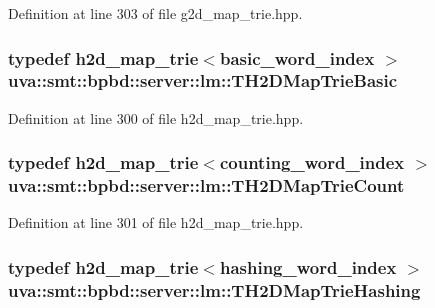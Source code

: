 Definition at line 303 of file g2d\+\_\+map\+\_\+trie.\+hpp.

\hypertarget{namespaceuva_1_1smt_1_1bpbd_1_1server_1_1lm_aa53359be0261f651cda52366e67b368f}{}
\subsubsection[{T\+H2\+D\+Map\+Trie\+Basic}]{\setlength{\rightskip}{0pt plus 5cm}typedef {\bf h2d\+\_\+map\+\_\+trie}$<${\bf basic\+\_\+word\+\_\+index} $>$ {\bf uva\+::smt\+::bpbd\+::server\+::lm\+::\+T\+H2\+D\+Map\+Trie\+Basic}}\label{namespaceuva_1_1smt_1_1bpbd_1_1server_1_1lm_aa53359be0261f651cda52366e67b368f}


Definition at line 300 of file h2d\+\_\+map\+\_\+trie.\+hpp.

\hypertarget{namespaceuva_1_1smt_1_1bpbd_1_1server_1_1lm_a16a3c338c8c70fdcef33b4ef40c645d6}{}
\subsubsection[{T\+H2\+D\+Map\+Trie\+Count}]{\setlength{\rightskip}{0pt plus 5cm}typedef {\bf h2d\+\_\+map\+\_\+trie}$<${\bf counting\+\_\+word\+\_\+index} $>$ {\bf uva\+::smt\+::bpbd\+::server\+::lm\+::\+T\+H2\+D\+Map\+Trie\+Count}}\label{namespaceuva_1_1smt_1_1bpbd_1_1server_1_1lm_a16a3c338c8c70fdcef33b4ef40c645d6}


Definition at line 301 of file h2d\+\_\+map\+\_\+trie.\+hpp.

\hypertarget{namespaceuva_1_1smt_1_1bpbd_1_1server_1_1lm_afebd21cb9a426954aecb066ea8272cf9}{}
\subsubsection[{T\+H2\+D\+Map\+Trie\+Hashing}]{\setlength{\rightskip}{0pt plus 5cm}typedef {\bf h2d\+\_\+map\+\_\+trie}$<${\bf hashing\+\_\+word\+\_\+index} $>$ {\bf uva\+::smt\+::bpbd\+::server\+::lm\+::\+T\+H2\+D\+Map\+Trie\+Hashing}}\label{namespaceuva_1_1smt_1_1bpbd_1_1server_1_1lm_afebd21cb9a426954aecb066ea8272cf9}


